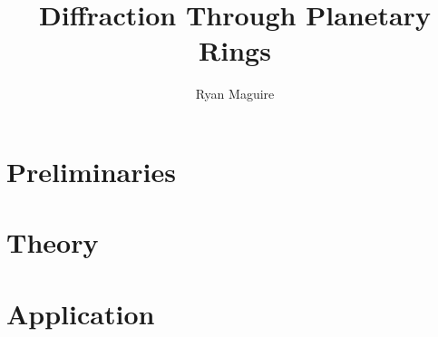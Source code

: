 \documentclass[oneside]{book}
\begin{document}
    \title{Diffraction Through Planetary Rings}
    \author{Ryan Maguire}
    \date{\vspace{-5ex}}
    \maketitle
    \tableofcontents
    \listoffigures
    \listoftables
    \clearpage
    
    \clearpage
    \part{Preliminaries}
        
        
        
        
        
        
        
        
        
        
        
        
        
        
        
        
        
        
        
        
        
        
        
        
        
        
        
    \part{Theory}
        
        
        
        
        
        
        
    \part{Application}
        
        
    \clearpage
    \printglossary[style=longpara]
\end{document}
